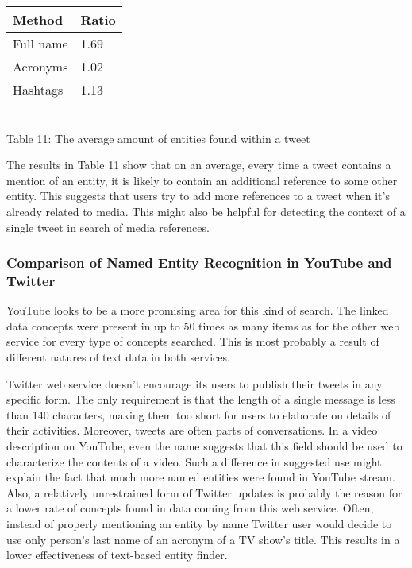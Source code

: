 \begin{center}
  \begin{tabular}{ | p{4cm} | p{2cm} | } \hline
    Method & Ratio \\ \hline
    Full name & 1.69 \\ \hline
    Acronyms & 1.02 \\ \hline
    Hashtags & 1.13 \\ \hline
  \end{tabular} \\
  Table 11: The average amount of entities found within a tweet \\
\end{center}

The results in Table 11 show that on an average, every time a tweet contains a mention of an entity,
it is likely to contain an additional reference to some other entity. This suggests that users try to add
more references to a tweet when it's already related to media. This might also be helpful for detecting the
context of a single tweet in search of media references.

\subsubsection{Comparison of Named Entity Recognition in YouTube and Twitter}
YouTube looks to be a more promising area for this kind of search. The
linked data concepts were present in up to 50 times as many items as for the other
web service for every type of concepts searched. This is most probably a
result of different natures of text data in both services.

Twitter web service doesn't encourage its users to publish their tweets in any
specific form. The only requirement is that the length of a single message
is less than 140 characters, making them too short for users to elaborate
on details of their activities. Moreover, tweets are often parts of
conversations. In a video description on YouTube, even the name
suggests that this field should be used to characterize the contents
of a video. Such a difference in suggested use might explain the fact that
much more named entities were found in YouTube stream. Also, a relatively
unrestrained form of Twitter updates is probably the reason for a lower rate of
concepts found in data coming from this web service. Often, instead of properly
mentioning an entity by name Twitter user would decide to use only person's
last name of an acronym of a TV show's title. This results in a
lower effectiveness of text-based entity finder.


